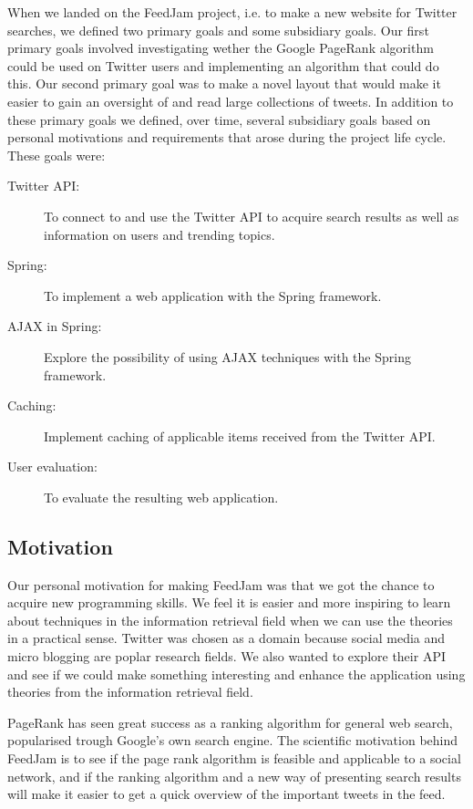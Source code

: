 When we landed on the FeedJam project, i.e. to make a new website for Twitter searches, we defined two primary goals and some subsidiary goals. Our first primary goals involved investigating wether the Google PageRank algorithm could be used on Twitter users and implementing an algorithm that could do this. Our second primary goal was to make a novel layout that would make it easier to gain an oversight of and read large collections of tweets. In addition to these primary goals we defined, over time, several subsidiary goals based on personal motivations and requirements that arose during the project life cycle. These goals were:

\begin{description}
  \item[Twitter API:] To connect to and use the Twitter API to acquire search results as well as information on users and trending topics.
  \item[Spring:] To implement a web application with the Spring framework.
  \item[AJAX in Spring:] Explore the possibility of using AJAX techniques with the Spring framework.
  \item[Caching:] Implement caching of applicable items received from the Twitter API.
  \item[User evaluation:] To evaluate the resulting web application.
\end{description}

\subsection{Motivation} %
Our personal motivation for making FeedJam was that we got the chance to acquire new programming skills. We feel it is easier and more inspiring to learn about techniques in the information retrieval field when we can use the theories in a practical sense. Twitter was chosen as a domain because social media and micro blogging are poplar research fields. We also wanted to explore their API and see if we could make something interesting and enhance the application using theories from the information retrieval field.

PageRank has seen great success as a ranking algorithm for general web search, popularised trough Google's own search engine. The scientific motivation behind FeedJam is to see if the page rank algorithm is feasible and applicable to a social network, and if the ranking algorithm and a new way of presenting search results will make it easier to get a quick overview of the important tweets in the feed.